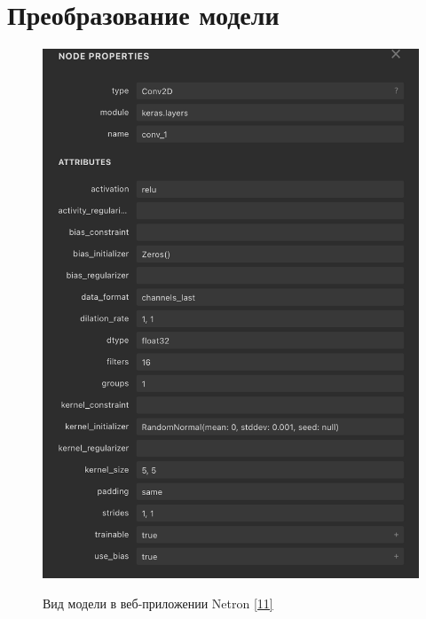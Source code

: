 \documentclass[a4paper,14pt]{extreport}
\begin{document}
        \section{Преобразование модели}
            \begin{figure}[!h]
                \begin{center}
                    \begin{minipage}[!h]{0.38\linewidth}
                        \includegraphics[width=1\linewidth]{images-pipeline/netron.png}
                        \label{ris:json}
                        \caption{Вид модели в веб-приложении Netron \hyperlink{[11]}{[11]}}
                    \end{minipage}
                    \hfill
                    \begin{minipage}[!h]{0.39\linewidth}

\end{minipage}
\end{center}
\end{figure}
\end{document}
